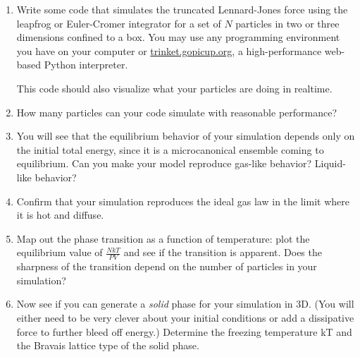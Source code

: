 \documentclass[12pt]{article}
\begin{document}
\begin{enumerate}
	\item Write some code that simulates the truncated Lennard-Jones force using the leapfrog or Euler-Cromer integrator for a set of $N$ particles in two or three dimensions confined to a box. You may use any programming environment you have on your computer or \url{trinket.gopicup.org}, a high-performance web-based Python interpreter. 
	
	This code should also visualize what your particles are doing in realtime.
	
	\item How many particles can your code simulate with reasonable performance?
	
	\item You will see that the equilibrium behavior of your simulation depends only on the initial total energy, since it is a microcanonical ensemble coming to equilibrium. Can you make your model reproduce gas-like behavior? Liquid-like behavior?
	
	\item Confirm that your simulation reproduces the ideal gas law in the limit where it is hot and diffuse.
	
	\item Map out the phase transition as a function of temperature: plot the equilibrium value of $\frac{NkT}{PV}$ and see if the transition is apparent. Does the sharpness of the transition depend on the number of particles in your simulation?
	
	\item Now see if you can generate a {\it solid} phase for your simulation in 3D. (You will either need to be very clever about your initial conditions or add a dissipative force to further bleed off energy.) Determine the freezing temperature kT and the Bravais lattice type of the solid phase.
	
\end{enumerate}
\end{document}
